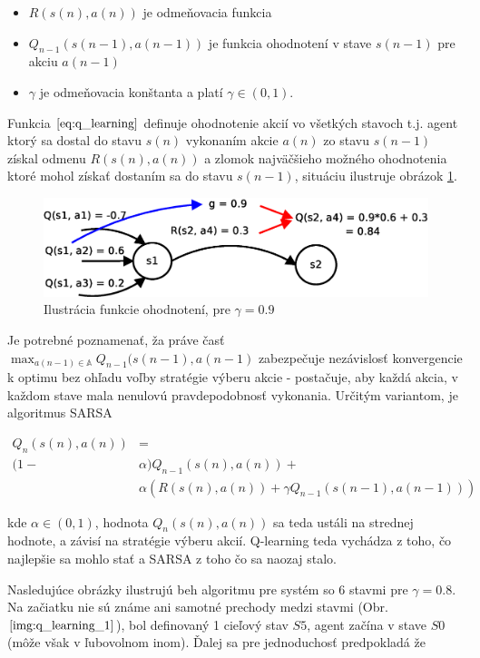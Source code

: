 \begin{itemize}
 \item $R(s(n),a(n))$ je odmeňovacia funkcia
 \item $Q_{n-1}(s(n-1),a(n-1))$ je funkcia ohodnotení v stave $s(n-1)$ pre akciu $a(n-1)$
 \item $\gamma$ je odmeňovacia konštanta a platí $\gamma \in (0, 1)$.
\end{itemize}

Funkcia $\ref{eq:q_learning}$ definuje ohodnotenie akcií vo všetkých stavoch t.j.
agent ktorý sa dostal do stavu $s(n)$ vykonaním akcie $a(n)$ zo stavu
$s(n-1)$ získal odmenu $R(s(n),a(n))$ a zlomok najväčšieho možného ohodnotenia ktoré
mohol získať dostaním sa do stavu $s(n-1)$, situáciu ilustruje obrázok \ref{img:q_learning}.


\begin{figure}[!htb]
\center
\includegraphics[scale=.6]{../diagrams/q_learning_detail.eps}
\caption{Ilustrácia funkcie ohodnotení, pre $\gamma = 0.9$}
\label{img:q_learning}
\end{figure}

Je potrebné poznamenať, ža práve časť $\max_{a(n-1) \in \mathbb{A}} Q_{n-1}(s(n-1), a(n-1)$
zabezpečuje nezávislosť konvergencie k optimu bez ohľadu voľby stratégie výberu akcie -
postačuje, aby každá akcia, v každom stave mala nenulovú pravdepodobnosť vykonania.
Určitým variantom, je algoritmus SARSA \cite{bib:sarsa}

\begin{align}
Q_{n}(s(n),a(n)) &= \nonumber \\
 (1-&\alpha)Q_{n-1}(s(n),a(n)) + \nonumber  \\
&\alpha(R(s(n),a(n)) + \gamma Q_{n-1}(s(n-1), a(n-1)))
\label{eq:sarsa}
\end{align}

kde $\alpha \in (0, 1)$, hodnota $Q_{n}(s(n),a(n))$ sa  teda ustáli na strednej hodnote,
a závisí na stratégie výberu akcií. Q-learning teda vychádza z toho, čo najlepšie sa mohlo stať
a SARSA z toho čo sa naozaj stalo.


Nasledujúce obrázky ilustrujú beh algoritmu pre systém so 6 stavmi pre $\gamma = 0.8$.
Na začiatku nie sú známe ani samotné prechody medzi stavmi (Obr. $\ref{img:q_learning_1}$), bol definovaný
1 cieľový stav $S5$, agent začína v stave $S0$ (môže však v ľubovolnom inom).
Ďalej sa pre jednoduchosť predpokladá že

